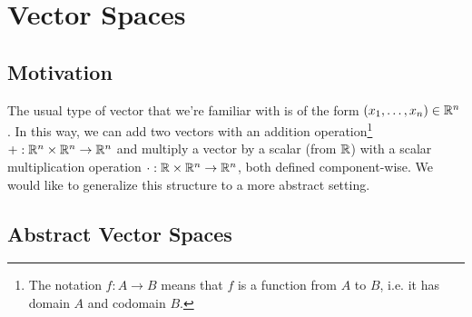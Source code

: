 \chapter{Vector Spaces}

\section{Motivation}
The usual type of vector that we're familiar with is
of the form $(x_1, \dots, x_n) \in \mathbb{R}^n$. In this
way, we can add two vectors with an addition
operation\footnote{The notation $f : A \to B$ means that
$f$ is a function from $A$ to $B$, i.e. it has domain $A$ and codomain $B$.} $+ : \mathbb{R}^n \times \mathbb{R}^n \to \mathbb{R}^n$ and
multiply a vector by a scalar (from $\mathbb{R}$)
with a scalar multiplication operation
$\cdot : \mathbb{R} \times \mathbb{R}^n \to \mathbb{R}^n$, both defined
component-wise. We would like to generalize this
structure to a more abstract setting.

\section{Abstract Vector Spaces}

